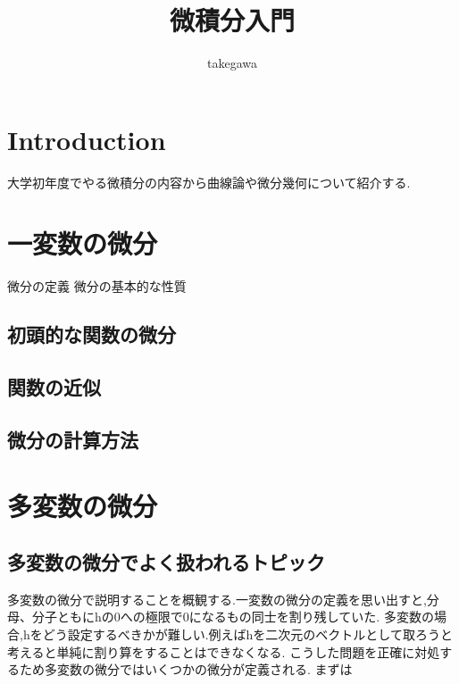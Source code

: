 \documentclass{ujarticle}
\title{微積分入門}
\author{takegawa}
\date{}
\begin{document}
\maketitle
\tableofcontents
\section{Introduction}
大学初年度でやる微積分の内容から曲線論や微分幾何について紹介する.

\section{一変数の微分}
微分の定義
微分の基本的な性質

\subsection{初頭的な関数の微分}
\subsection{関数の近似}
\begin{thm}[ロルの定理]

\end{thm}

\begin{thm}[平均値の定理]

\end{thm}

\begin{thm}[テイラーの定理]

\end{thm}

\subsection{微分の計算方法}


\section{多変数の微分}
\subsection{多変数の微分でよく扱われるトピック}
多変数の微分で説明することを概観する.一変数の微分の定義を思い出すと,分母、分子ともにhの0への極限で0になるもの同士を割り残していた.
多変数の場合,hをどう設定するべきかが難しい.例えばhを二次元のベクトルとして取ろうと考えると単純に割り算をすることはできなくなる.
こうした問題を正確に対処するため多変数の微分ではいくつかの微分が定義される.
まずは
\end{document}
